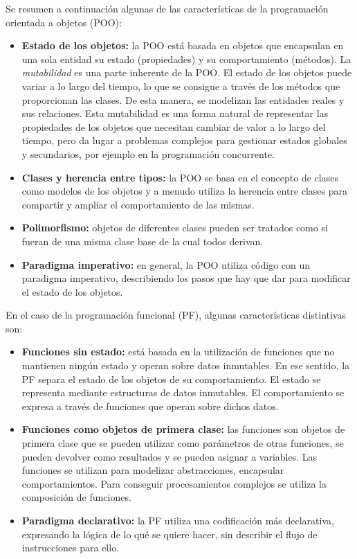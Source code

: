 Se resumen a continuación algunas de las características de la programación orientada a objetos (POO):
\begin{itemize}
   \item \textbf{Estado de los objetos:} la POO está basada en objetos que encapsulan en una sola entidad su estado (propiedades) y su comportamiento (métodos). La \textit{mutabilidad} es una parte inherente de la POO. El estado de los objetos puede variar a lo largo del tiempo, lo que se consigue a través de los métodos que proporcionan las clases. De esta manera, se modelizan las entidades reales y sus relaciones. Esta mutabilidad es una forma natural de representar las propiedades de los objetos que necesitan cambiar de valor a lo largo del tiempo, pero da lugar a problemas complejos para gestionar estados globales y secundarios, por ejemplo en la programación concurrente.
   \item \textbf{Clases y herencia entre tipos:} la POO se basa en el concepto de clases como modelos de los objetos y a menudo utiliza la herencia entre clases para compartir y ampliar el comportamiento de las mismas.
   \item \textbf{Polimorfismo:} objetos de diferentes clases pueden ser tratados como si fueran de una misma clase base de la cual todos derivan.
   \item \textbf{Paradigma imperativo:} en general, la POO utiliza código con un paradigma imperativo, describiendo los pasos que hay que dar para modificar el estado de los objetos.
\end{itemize}

En el caso de la programación funcional (PF), algunas características distintivas son:
\begin{itemize}
   \item \textbf{Funciones sin estado:} está basada en la utilización de funciones que no mantienen ningún estado y operan sobre datos inmutables. En ese sentido, la PF separa el estado de los objetos de su comportamiento. El estado se representa mediante estructuras de datos inmutables. El comportamiento se expresa a través de funciones que operan sobre dichos datos.
   \item \textbf{Funciones como objetos de primera clase:} las funciones son objetos de primera clase que se pueden utilizar como parámetros de otras funciones, se pueden devolver como resultados y se pueden asignar a variables. Las funciones se utilizan para modelizar abstracciones, encapsular comportamientos. Para conseguir procesamientos complejos se utiliza la composición de funciones.
   \item \textbf{Paradigma declarativo:} la PF utiliza una codificación más declarativa, expresando la lógica de lo qué se quiere hacer, sin describir el flujo de instrucciones para ello. 
\end{itemize}

